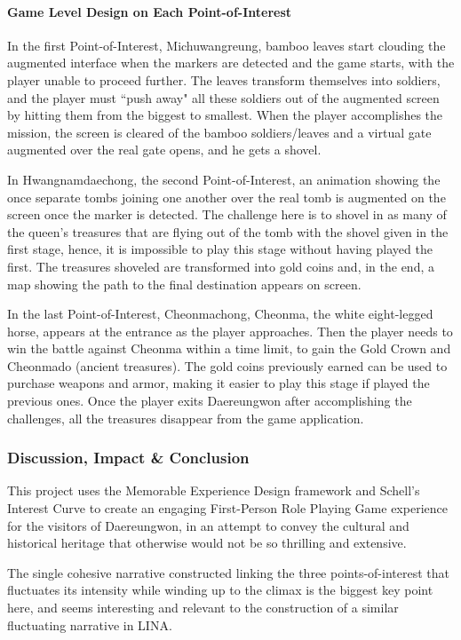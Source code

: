 \documentclass[runningheads]{llncs}
\begin{document}
\paragraph{Game Level Design on Each Point-of-Interest} In the first Point-of-Interest, Michuwangreung, bamboo leaves start clouding the augmented interface when the markers are detected and the game starts, with the player unable to proceed further. The leaves transform themselves into soldiers, and the player must ``push away" all these soldiers out of the augmented screen by hitting them from the biggest to smallest. When the player accomplishes the mission, the screen is cleared of the bamboo soldiers/leaves and a virtual gate augmented over the real gate opens, and he gets a shovel.
\par In Hwangnamdaechong, the second Point-of-Interest, an animation showing the once separate 
tombs joining one another over the real tomb is augmented on the screen once the marker is detected. The challenge here is to shovel in as many of the queen’s treasures that are flying out of the tomb with the shovel given in the first stage, hence, it is impossible to play this stage 
without having played the first. The treasures shoveled are transformed into gold coins and, in the end, a map showing the path to the final destination appears on screen.
\par In the last Point-of-Interest, Cheonmachong, Cheonma, the white eight-legged horse, appears at the entrance as the player approaches. Then the player needs to win the battle against Cheonma within a time limit, to gain the Gold Crown and Cheonmado (ancient treasures). The gold coins previously earned can be used to purchase weapons and armor, making it easier to play this stage if played the previous ones. Once the player exits Daereungwon after accomplishing the challenges, all the treasures disappear from the game application. 


\subsubsection{Discussion, Impact \& Conclusion}
\par This project uses the Memorable Experience Design framework and Schell's Interest Curve to create an engaging First-Person Role Playing Game experience for the visitors of Daereungwon, in an attempt to convey the cultural and historical heritage that otherwise would not be so thrilling and extensive. 
\par The single cohesive narrative constructed linking the three points-of-interest that fluctuates its intensity while winding up to the climax is the biggest key point here, and seems interesting and relevant to the construction of a similar fluctuating narrative in LINA. 
\end{document}
